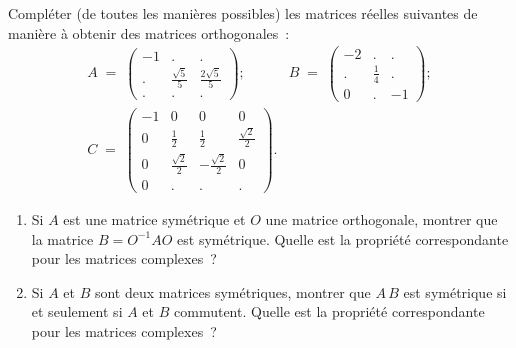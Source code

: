 \documentclass[12pt,french,oneside,a4paper]{memoir} %
\begin{document}
\begin{exo}
Compléter (de toutes les manières possibles) les matrices réelles suivantes de manière à obtenir des matrices orthogonales~:
\begin{equation*}
\begin{array}{ll}
A \;=\; \left( \begin{array}{ccc}
-1 &. &. \\
\mbox{.} &\displaystyle{\frac{\sqrt{5}}{5}} &\displaystyle{\frac{2 \sqrt{5}}{5}} \\
\mbox{.} &. &. \end{array} \right); \qquad 
& B \;=\; \left( \begin{array}{ccc}
-2 &. &. \\
\mbox{.} &\displaystyle{\frac{1}{4}} &. \\
0 &. &-1 \end{array} \right); \\
C \;=\; \left( \begin{array}{cccc}
-1 &0 &0 &0 \\
0 &\displaystyle{\frac{1}{2}} &\displaystyle{\frac{1}{2}} 
&\displaystyle{\frac{\sqrt{2}}{2}} \\
0 &\displaystyle{\frac{\sqrt{2}}{2}} &- \displaystyle{\frac{\sqrt{2}}{2}} &0 \\
0 &. &. &. \end{array} \right). &
\end{array}
\end{equation*}

\end{exo}
\begin{exo}
\begin{enumerate}
\item Si $A$ est une matrice symétrique et $O$ une matrice orthogonale, montrer que la matrice $B=O^{-1}AO$ est symétrique. Quelle est la propriété correspondante pour les matrices complexes~?
\item Si $A$ et $B$ sont deux matrices symétriques, montrer que $A \, B$ est symétrique si et seulement si $A$ et $B$ commutent. 
Quelle est la propriété correspondante pour les matrices complexes~?
\end{enumerate}
\end{exo}
\end{document}
